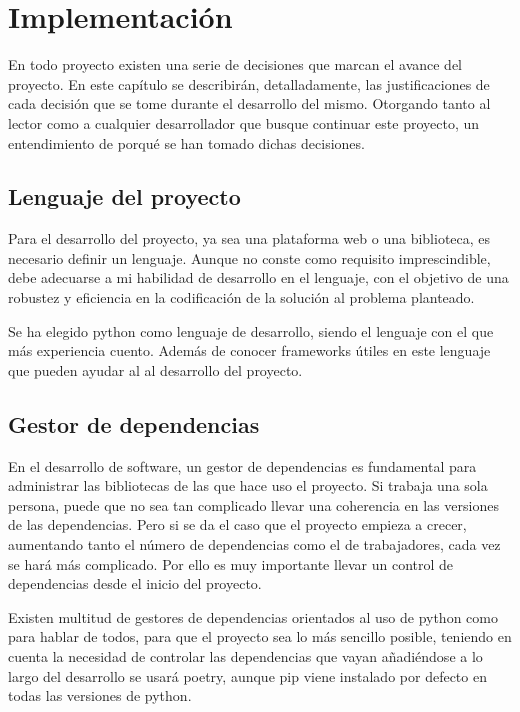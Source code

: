 \chapter{Implementación}
En todo proyecto existen una serie de decisiones que marcan el avance del proyecto. En este capítulo se describirán, detalladamente, las justificaciones de cada decisión que se tome durante el desarrollo del mismo. Otorgando tanto al lector como a cualquier desarrollador que busque continuar este proyecto, un entendimiento de porqué se han tomado dichas decisiones.

\section{Lenguaje del proyecto}
Para el desarrollo del proyecto, ya sea una plataforma web o una biblioteca, es necesario definir un lenguaje. Aunque no conste como requisito imprescindible, debe adecuarse a mi habilidad de desarrollo en el lenguaje, con el objetivo de una robustez y eficiencia en la codificación de la solución al problema planteado. 

Se ha elegido \Gls{python} como lenguaje de desarrollo, siendo el lenguaje con el que más experiencia cuento. Además de conocer frameworks útiles en este lenguaje que pueden ayudar al al desarrollo del proyecto.

\section{Gestor de dependencias}
En el desarrollo de software, un gestor de \glspl{dependencia} es fundamental para administrar las bibliotecas de las que hace uso el proyecto. Si trabaja una sola persona, puede que no sea tan complicado llevar una coherencia en las versiones de las \glspl{dependencia}. Pero si se da el caso que el proyecto empieza a crecer, aumentando tanto el número de \glspl{dependencia} como el de trabajadores, cada vez se hará más complicado. Por ello es muy importante llevar un control de \glspl{dependencia} desde el inicio del proyecto.

Existen multitud de gestores de \glspl{dependencia} orientados al uso de \Gls{python} como para hablar de todos, para que el proyecto sea lo más sencillo posible, teniendo en cuenta la necesidad de controlar las \glspl{dependencia} que vayan añadiéndose a lo largo del desarrollo se usará \Gls{poetry}, aunque \Gls{pip} viene instalado por defecto en todas las versiones de \Gls{python}. 

